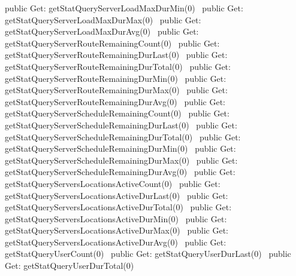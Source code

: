 public \LA{}Get: getStatQueryServerLoadMaxDurMin(0)~{\nwtagstyle{}}\RA{}
public \LA{}Get: getStatQueryServerLoadMaxDurMax(0)~{\nwtagstyle{}}\RA{}
public \LA{}Get: getStatQueryServerLoadMaxDurAvg(0)~{\nwtagstyle{}}\RA{}
public \LA{}Get: getStatQueryServerRouteRemainingCount(0)~{\nwtagstyle{}}\RA{}
public \LA{}Get: getStatQueryServerRouteRemainingDurLast(0)~{\nwtagstyle{}}\RA{}
public \LA{}Get: getStatQueryServerRouteRemainingDurTotal(0)~{\nwtagstyle{}}\RA{}
public \LA{}Get: getStatQueryServerRouteRemainingDurMin(0)~{\nwtagstyle{}}\RA{}
public \LA{}Get: getStatQueryServerRouteRemainingDurMax(0)~{\nwtagstyle{}}\RA{}
public \LA{}Get: getStatQueryServerRouteRemainingDurAvg(0)~{\nwtagstyle{}}\RA{}
public \LA{}Get: getStatQueryServerScheduleRemainingCount(0)~{\nwtagstyle{}}\RA{}
public \LA{}Get: getStatQueryServerScheduleRemainingDurLast(0)~{\nwtagstyle{}}\RA{}
public \LA{}Get: getStatQueryServerScheduleRemainingDurTotal(0)~{\nwtagstyle{}}\RA{}
public \LA{}Get: getStatQueryServerScheduleRemainingDurMin(0)~{\nwtagstyle{}}\RA{}
public \LA{}Get: getStatQueryServerScheduleRemainingDurMax(0)~{\nwtagstyle{}}\RA{}
public \LA{}Get: getStatQueryServerScheduleRemainingDurAvg(0)~{\nwtagstyle{}}\RA{}
public \LA{}Get: getStatQueryServersLocationsActiveCount(0)~{\nwtagstyle{}}\RA{}
public \LA{}Get: getStatQueryServersLocationsActiveDurLast(0)~{\nwtagstyle{}}\RA{}
public \LA{}Get: getStatQueryServersLocationsActiveDurTotal(0)~{\nwtagstyle{}}\RA{}
public \LA{}Get: getStatQueryServersLocationsActiveDurMin(0)~{\nwtagstyle{}}\RA{}
public \LA{}Get: getStatQueryServersLocationsActiveDurMax(0)~{\nwtagstyle{}}\RA{}
public \LA{}Get: getStatQueryServersLocationsActiveDurAvg(0)~{\nwtagstyle{}}\RA{}
public \LA{}Get: getStatQueryUserCount(0)~{\nwtagstyle{}}\RA{}
public \LA{}Get: getStatQueryUserDurLast(0)~{\nwtagstyle{}}\RA{}
public \LA{}Get: getStatQueryUserDurTotal(0)~{\nwtagstyle{}}\RA{}
